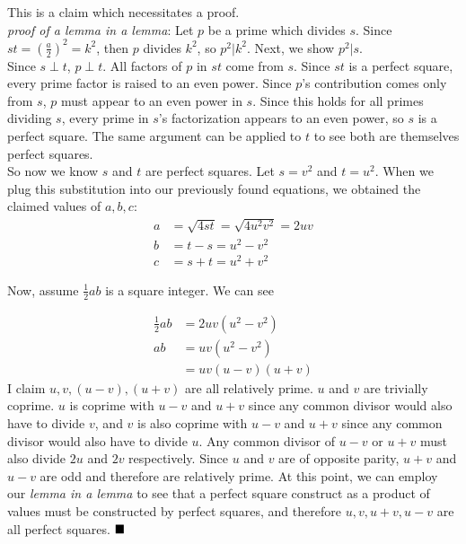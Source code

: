 \documentclass[10pt]{article}
\begin{document}
\begin{enumerate}
            This is a claim which necessitates a proof.\\

            \textit{proof of a lemma in a lemma}: Let $p$ be a prime which divides $s$. Since $st = \left(\frac{a}{2}\right)^2 = k^2$, then $p$ divides $k^2$, so $p^2 | k^2$. Next, we show $p^2 | s$.\\

            Since $s \perp t$, $p \perp t$. All factors of $p$ in $st$ come from $s$. Since $st$ is a perfect square, every prime factor is raised to an even power. Since $p$'s contribution comes only from $s$, $p$ must appear to an even power in $s$. Since this holds for all primes dividing $s$, every prime in $s$'s factorization appears to an even power, so $s$ is a perfect square. The same argument can be applied to $t$ to see both are themselves perfect squares.\\

            So now we know $s$ and $t$ are perfect squares. Let $s = v^2$ and $t = u^2$. When we plug this substitution into our previously found equations, we obtained the claimed values of $a, b, c$:
            \begin{align*}
                a &= \sqrt{4st} =\sqrt{4u^2v^2} = 2uv\\
                b &= t - s = u^2 - v^2\\
                c &= s + t = u^2 + v^2
            \end{align*}

            Now, assume $\frac{1}{2}ab$ is a square integer. We can see

            \begin{align*}
                \frac{1}{2}ab &= 2uv(u^2 - v^2)\\
                        ab &= uv(u^2 - v^2)\\
                           &= uv(u - v)(u + v)
            \end{align*}
            I claim $u, v, (u-v), (u + v)$ are all relatively prime. $u$ and $v$ are trivially coprime. $u$ is coprime with $u - v$ and $u + v$ since any common divisor would also have to divide $v$, and $v$ is also coprime with $u - v$ and $u + v$ since any common divisor would also have to divide $u$. Any common divisor of $u - v$ or $u + v$ must also divide $2u$ and $2v$ respectively. Since $u$ and $v$ are of opposite parity, $u+v$ and $u - v$ are odd and therefore are relatively prime. At this point, we can employ our \textit{lemma in a lemma} to see that a perfect square construct as a product of values must be constructed by perfect squares, and therefore $u, v, u + v, u-v$ are all perfect squares. $\hfill\blacksquare$


\end{enumerate}
\end{document}
